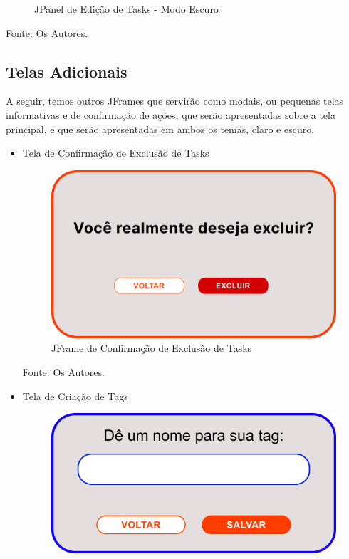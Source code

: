 \documentclass[a4paper,12pt]{article}
\begin{document}
\begin{itemize}
\begin{figure}[H]
		\caption{JPanel de Edição de Tasks - Modo Escuro}
	\end{figure}
	\noindent Fonte: Os Autores.
\end{itemize}

\pagebreak
\subsection{Telas Adicionais}
A seguir, temos outros JFrames que servirão como modais, ou pequenas telas informativas e de confirmação de ações, que serão apresentadas sobre a 
tela principal, e que serão apresentadas em ambos os temas, claro e escuro.
\begin{itemize}
	\item Tela de Confirmação de Exclusão de Tasks
	\begin{figure}[H]
		\centering
		\includegraphics[scale=0.19]{prototypes/white/Modal Confirmation.png}
		\caption{JFrame de Confirmação de Exclusão de Tasks}
	\end{figure}
	\noindent Fonte: Os Autores.
	\item Tela de Criação de Tags
	\begin{figure}[H]
		\centering
		\includegraphics[scale=0.19]{prototypes/white/Add Tag.png}

\end{figure}
\end{itemize}
\end{document}
